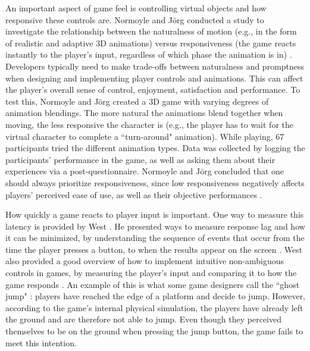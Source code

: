 An important aspect of game feel is controlling virtual objects and how responsive these controls are. Normoyle and J\"{o}rg conducted a study to investigate the relationship between the naturalness of motion (e.g., in the form of realistic and adaptive 3D animations) versus responsiveness (the game reacts instantly to the player's input, regardless of which phase the animation is in) \cite{normoyle_trade-offs_2014}. Developers typically need to make trade-offs between naturalness and promptness when designing and implementing player controls and animations. This can affect the player's overall sense of control, enjoyment, satisfaction and performance. To test this, Normoyle and J\"{o}rg  created a 3D game with varying degrees of animation blendings. The more natural the animations blend together when moving, the less responsive the character is (e.g., the player has to wait for the virtual character to complete a ``turn-around" animation). While playing, 67 participants tried the different animation types.  Data was collected by logging the participants' performance in the game, as well as asking them about their experiences via a post-questionnaire. Normoyle and J\"{o}rg concluded that one should always prioritize responsiveness, since low responsiveness negatively affects players' perceived ease of use, as well as their objective performances \cite{normoyle_trade-offs_2014}.


How quickly a game reacts to player input is important. One way to measure this latency is provided by West \cite{measure_lag}. He presented ways to measure response lag and how it can be minimized, by understanding the sequence of events that occur from the time the player presses a button, to when the results appear on the screen \cite{program_lag}. West also provided a good overview of how to implement intuitive non-ambiguous controls in games, by measuring the player's input and comparing it to how the game responds \cite{intuitive_buttons}. An example of this is what some game designers call the ``ghost jump" \cite{ghostJump, canabalt}: players have reached the edge of a platform and decide to jump. However, according to the game's internal physical simulation, the players have already left the ground and are therefore not able to jump. Even though they perceived themselves to be on the ground when pressing the jump button, the game fails to meet this intention.

